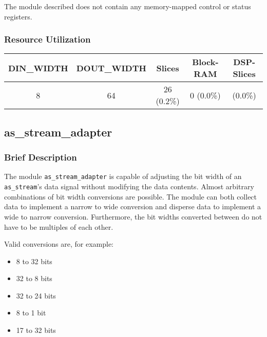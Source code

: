 The module described does not contain any memory-mapped control or status registers.

\subsubsection{Resource Utilization}

%
%
%

\begin{tabular}{|c|c|c|c|c|}
    \hline
    DIN\_WIDTH & DOUT\_WIDTH & Slices & Block-RAM & DSP-Slices \\ \hline
    8 & 64 & 26 (0.2\%) & 0 (0.0\%) & (0.0\%) \\ \hline
\end{tabular}



\subsection{as\_stream\_adapter}


\subsubsection{Brief Description}

The module \texttt{as\_stream\_adapter} is capable of adjusting the bit width of an \texttt{as\_stream}'s data signal without modifying the data contents.
Almost arbitrary combinations of bit width conversions are possible.
The module can both collect data to implement a narrow to wide conversion and disperse data to implement a wide to narrow conversion.
Furthermore, the bit widths converted between do not have to be multiples of each other.

Valid conversions are, for example:
\begin{itemize}
\setlength\itemsep{-0.2em}
\item 8 to 32 bits
\item 32 to 8 bits
\item 32 to 24 bits
\item 8 to 1 bit
\item 17 to 32 bits
\end{itemize}
 
